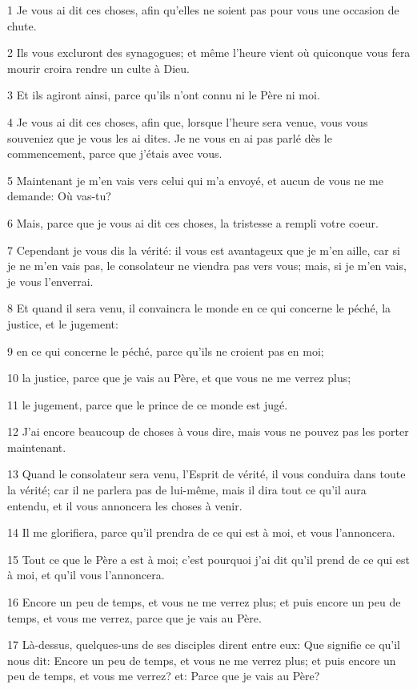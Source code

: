 \par 1 Je vous ai dit ces choses, afin qu'elles ne soient pas pour vous une occasion de chute.
\par 2 Ils vous excluront des synagogues; et même l'heure vient où quiconque vous fera mourir croira rendre un culte à Dieu.
\par 3 Et ils agiront ainsi, parce qu'ils n'ont connu ni le Père ni moi.
\par 4 Je vous ai dit ces choses, afin que, lorsque l'heure sera venue, vous vous souveniez que je vous les ai dites. Je ne vous en ai pas parlé dès le commencement, parce que j'étais avec vous.
\par 5 Maintenant je m'en vais vers celui qui m'a envoyé, et aucun de vous ne me demande: Où vas-tu?
\par 6 Mais, parce que je vous ai dit ces choses, la tristesse a rempli votre coeur.
\par 7 Cependant je vous dis la vérité: il vous est avantageux que je m'en aille, car si je ne m'en vais pas, le consolateur ne viendra pas vers vous; mais, si je m'en vais, je vous l'enverrai.
\par 8 Et quand il sera venu, il convaincra le monde en ce qui concerne le péché, la justice, et le jugement:
\par 9 en ce qui concerne le péché, parce qu'ils ne croient pas en moi;
\par 10 la justice, parce que je vais au Père, et que vous ne me verrez plus;
\par 11 le jugement, parce que le prince de ce monde est jugé.
\par 12 J'ai encore beaucoup de choses à vous dire, mais vous ne pouvez pas les porter maintenant.
\par 13 Quand le consolateur sera venu, l'Esprit de vérité, il vous conduira dans toute la vérité; car il ne parlera pas de lui-même, mais il dira tout ce qu'il aura entendu, et il vous annoncera les choses à venir.
\par 14 Il me glorifiera, parce qu'il prendra de ce qui est à moi, et vous l'annoncera.
\par 15 Tout ce que le Père a est à moi; c'est pourquoi j'ai dit qu'il prend de ce qui est à moi, et qu'il vous l'annoncera.
\par 16 Encore un peu de temps, et vous ne me verrez plus; et puis encore un peu de temps, et vous me verrez, parce que je vais au Père.
\par 17 Là-dessus, quelques-uns de ses disciples dirent entre eux: Que signifie ce qu'il nous dit: Encore un peu de temps, et vous ne me verrez plus; et puis encore un peu de temps, et vous me verrez? et: Parce que je vais au Père?
